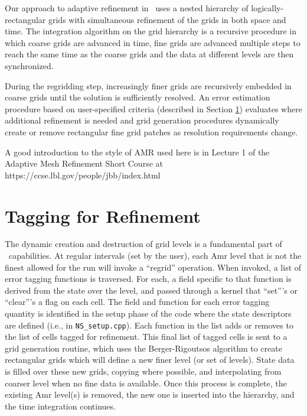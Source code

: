 Our approach to adaptive refinement in \iamr\ uses a nested
hierarchy of logically-rectangular grids with simultaneous refinement
of the grids in both space and time.  The integration algorithm on the grid hierarchy
is a recursive procedure in which coarse grids are advanced in time,
fine grids are advanced multiple steps to reach the same time
as the coarse grids and the data at different levels are then synchronized.

During the regridding step, increasingly finer grids
are recursively embedded in coarse grids until the solution is
sufficiently resolved.  An error estimation procedure based on
user-specified criteria (described in Section \ref{sec:tagging}) 
evaluates where additional refinement is needed
and grid generation procedures dynamically create or
remove rectangular fine grid patches as resolution requirements change.

A good introduction to the style of AMR used here is in Lecture 1
of the Adaptive Mesh Refinement Short Course at
https://ccse.lbl.gov/people/jbb/index.html

\section{Tagging for Refinement}
\label{sec:tagging}

The dynamic creation and destruction of grid levels is a fundamental part of \iamr\ capabilities.
At regular intervals (set by the user), each Amr level that is not the finest allowed for the run
will invoke a ``regrid'' operation.  When invoked, a list of error tagging functions is traversed. For each,
a field specific to that function is derived from the state over the level, and passed through a kernel
that ``set'''s or ``clear'''s a flag on each cell.  The field and function for each error tagging quantity is
identified in the setup phase of the code where the state descriptors are defined (i.e., in {\tt NS\_setup.cpp}).
Each function in the list adds or removes to the list of cells tagged for refinement. This final list of tagged
cells is sent to a grid generation routine, which uses the Berger-Rigoutsos algorithm to create rectangular grids
which will define a new finer level (or set of levels).  State data is filled over these new grids, copying where
possible, and interpolating from coarser level when no fine data is available.  Once this process is complete,
the existing Amr level(s) is removed, the new one is inserted into the hierarchy, and the time integration
continues.

